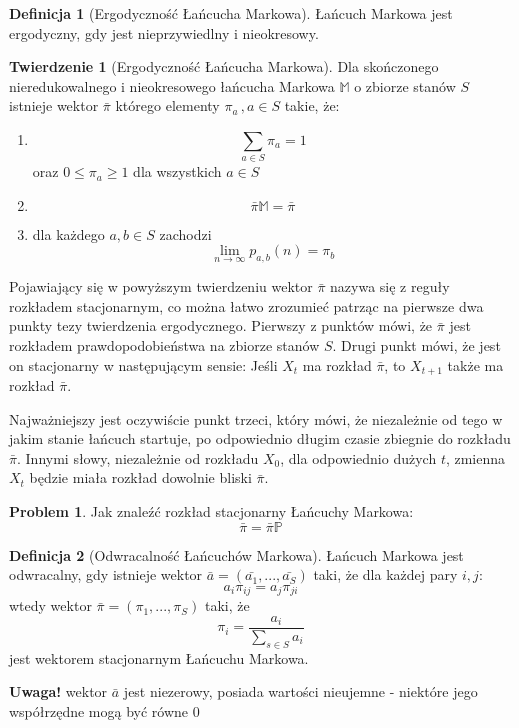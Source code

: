 \documentclass[a4paper,12pt]{article}
\theoremstyle{definition}%
\newtheorem{theorem}{Twierdzenie}%
\theoremstyle{definition}
\newtheorem{definition}{Definicja}%
\theoremstyle{problem}
\newtheorem*{problem*}{Problem}
\begin{document}
\begin{definition}[Ergodyczność Łańcucha Markowa]\label{def:ergodycznoscLM}
Łańcuch Markowa jest ergodyczny, gdy jest nieprzywiedlny i nieokresowy.
\end{definition}

\begin{theorem}[Ergodyczność Łańcucha Markowa]\label{the:ergodycznoscLM2}%
Dla skończonego nieredukowalnego i nieokresowego łańcucha Markowa $\mathbb{M}$ o zbiorze stanów $S$ istnieje wektor $\bar{\pi}$ którego elementy $\pi _a\,,a\in S$ takie, że:
\begin{enumerate}
\item $$\sum _{a\in S} \pi _a=1$$ oraz $0\leq \pi _a\geq 1$ dla wszystkich $a\in S$
\item $$\bar{\pi}\mathbb{M}=\bar{\pi}$$
\item dla każdego $a,b\in S$ zachodzi $$\lim _{n\rightarrow \infty} p_{a,b}(n)= \pi _b$$
\end{enumerate}
Pojawiający się w powyższym twierdzeniu wektor $\bar{\pi}$ nazywa się z reguły rozkładem stacjonarnym, co można łatwo zrozumieć patrząc na pierwsze dwa punkty tezy twierdzenia ergodycznego. Pierwszy z punktów mówi, że $\bar{\pi}$ jest rozkładem prawdopodobieństwa na zbiorze stanów $S$. Drugi punkt mówi, że jest on stacjonarny w następującym sensie: Jeśli $X_t$ ma rozkład $\bar{\pi}$, to $X_{t+1}$ także ma rozkład $\bar{\pi}$.

Najważniejszy jest oczywiście punkt trzeci, który mówi, że niezależnie od tego w jakim stanie łańcuch startuje, po odpowiednio długim czasie zbiegnie do rozkładu $\bar{\pi}$. Innymi słowy, niezależnie od rozkładu $X_0$, dla odpowiednio dużych $t$, zmienna $X_t$ będzie miała rozkład dowolnie bliski $\bar{\pi}$.
\end{theorem}


\begin{problem*}
Jak znaleźć rozkład stacjonarny Łańcuchy Markowa:
$$\bar{\pi}=\bar{\pi}\mathbb{P}$$
\end{problem*}

\begin{definition}[Odwracalność Łańcuchów Markowa]\label{def:OdwracalnoscLM}
Łańcuch Markowa jest odwracalny, gdy istnieje wektor $\bar{a}=(\bar{a_1}, ..., \bar{a_S})$ taki, że dla każdej pary $i,j$: $$a_i\pi _{ij}=a_j\pi _{ji}$$  wtedy wektor $\bar{\pi}=(\pi _1,...,\pi _S)$ taki, że $$\pi _i=\frac{a_i}{\sum _{s\in S}a_i}$$ jest wektorem stacjonarnym Łańcuchu Markowa.

\textbf{Uwaga!} wektor $\bar{a}$ jest niezerowy, posiada wartości nieujemne - niektóre jego współrzędne mogą być równe $0$
\end{definition}
\end{document}
